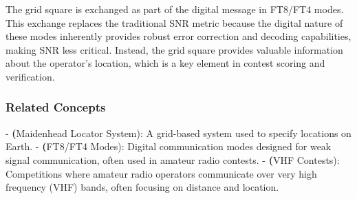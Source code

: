 The grid square is exchanged as part of the digital message in FT8/FT4 modes. This exchange replaces the traditional SNR metric because the digital nature of these modes inherently provides robust error correction and decoding capabilities, making SNR less critical. Instead, the grid square provides valuable information about the operator's location, which is a key element in contest scoring and verification.

\subsubsection*{Related Concepts}
- \textbf(Maidenhead Locator System): A grid-based system used to specify locations on Earth.
- \textbf(FT8/FT4 Modes): Digital communication modes designed for weak signal communication, often used in amateur radio contests.
- \textbf(VHF Contests): Competitions where amateur radio operators communicate over very high frequency (VHF) bands, often focusing on distance and location.

